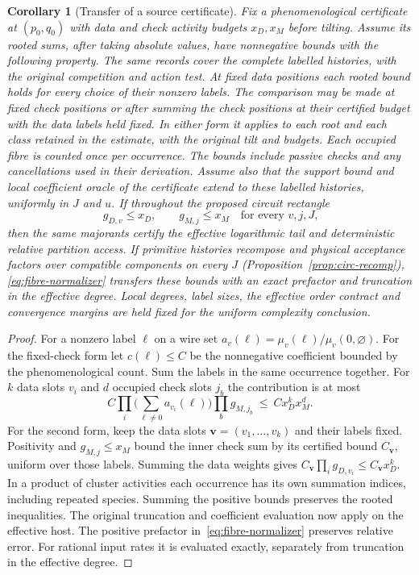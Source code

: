 \documentclass[10pt,twocolumn]{article}
\newtheorem{corollary}[theorem]{Corollary}
\theoremstyle{definition}
\begin{document}
\begin{corollary}[Transfer of a source certificate]\label{cor:fibre-transfer}
Fix a phenomenological certificate at $(p_0,q_0)$ with data and check
activity budgets $x_D,x_M$ before tilting. Assume its rooted sums,
after taking absolute values, have nonnegative bounds with the
following property. The same records cover the complete labelled
histories, with the original competition and action test. At fixed data
positions each rooted bound holds for every choice of their nonzero
labels. The comparison may be made at fixed check positions or after
summing the check positions at their certified budget with the data
labels held fixed. In either form it applies to each root and each
class retained in the estimate, with the original tilt and budgets.
Each occupied fibre is counted once per occurrence. The bounds include
passive checks and any cancellations used in their derivation. Assume also
that the support bound and local coefficient oracle of the certificate
extend to these labelled histories, uniformly in $J$ and $u$.
If throughout the proposed circuit rectangle
\begin{equation}\label{eq:fibre-transfer-test}
 g_{D,v}\le x_D,\qquad g_{M,j}\le x_M
 \quad\text{for every $v,j,J$,}
\end{equation}
then the same majorants certify the effective logarithmic tail and
deterministic relative partition access. If primitive histories recompose
and physical acceptance factors over compatible components on every $J$
(Proposition~\ref{prop:circ-recomp}), \eqref{eq:fibre-normalizer} transfers
these bounds with an exact prefactor and truncation in the effective
degree. Local degrees, label sizes,
the effective order contract and convergence margins are held fixed
for the uniform complexity conclusion.
\end{corollary}
\begin{proof}
For a nonzero label $\ell$ on a wire set
$a_v(\ell)=\mu_v(\ell)/\mu_v(0,\varnothing)$. For the fixed-check form let
$c(\boldsymbol\ell)\le C$ be the nonnegative coefficient bounded by the
phenomenological count. Sum the labels in the same occurrence together.
For $k$ data slots $v_i$ and $d$ occupied check slots $j_b$ the contribution is
at most
\[
 C\prod_i\Big(\sum_{\ell\ne0}a_{v_i}(\ell)\Big)
       \prod_b g_{M,j_b}
 \ \le\ C x_D^k x_M^d.
\]
For the second form, keep the data slots $\mathbf v=(v_1,\ldots,v_k)$
and their labels fixed.
Positivity and $g_{M,j}\le x_M$ bound the inner check sum by its
certified bound $C_{\mathbf v}$, uniform over those labels. Summing the
data weights gives $C_{\mathbf v}\prod_i g_{D,v_i}\le C_{\mathbf v}x_D^k$.
In a product of cluster activities each occurrence has its own summation
indices, including repeated species. Summing the positive bounds
preserves the rooted inequalities. The original truncation and coefficient
evaluation now apply on the effective host. The positive prefactor
in~\eqref{eq:fibre-normalizer} preserves relative error. For rational
input rates it is evaluated exactly, separately from truncation in
the effective degree.
\end{proof}
\end{document}
